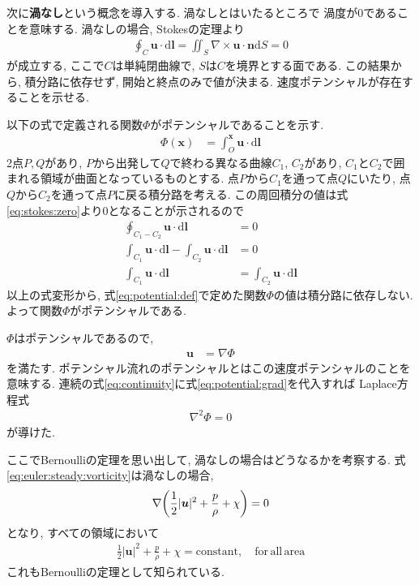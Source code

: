 \documentclass{ltjsarticle}
\begin{document}
次に\textbf{渦なし}という概念を導入する. 渦なしとはいたるところで
渦度が0であることを意味する. 
渦なしの場合, Stokesの定理より
\begin{align}
    \oint_{C} \bm{u}\cdot\mathrm{d}\bm{l} 
    = \iint_S\nabla\times\bm{u}\cdot\bm{n}\mathrm{d}S =0
    \label{eq:stokes:zero}
\end{align}
が成立する, 
ここで$C$は単純閉曲線で, $S$は$C$を境界とする面である. 
この結果から, 積分路に依存せず, 開始と終点のみで値が決まる.
速度ポテンシャルが存在することを示せる.

以下の式で定義される関数$\Phi$がポテンシャルであることを示す.
\begin{align}
    \Phi(\bm{x}) &= \int_O^{\bm{x}} \bm{u}\cdot\mathrm{d}\bm{l} \label{eq:potential:def}
\end{align}
2点$P,Q$があり, $P$から出発して$Q$で終わる異なる曲線$C_1$, $C_2$があり,
$C_1$と$C_2$で囲まれる領域が曲面となっているものとする.
点$P$から$C_1$を通って点$Q$にいたり, 点$Q$から$C_2$を通って点$P$に戻る積分路を考える.
この周回積分の値は式\eqref{eq:stokes:zero}より0となることが示されるので
\begin{align}
    \oint_{C_1-C_2}\bm{u}\cdot\mathrm{d}\bm{l} &= 0 \\
    \int_{C_1}\bm{u}\cdot\mathrm{d}\bm{l}-\int_{C_2}\bm{u}\cdot\mathrm{d}\bm{l} &=0\\
    \int_{C_1}\bm{u}\cdot\mathrm{d}\bm{l}&=\int_{C_2}\bm{u}\cdot\mathrm{d}\bm{l}
\end{align}
以上の式変形から, 式\eqref{eq:potential:def}で定めた関数$\Phi$の値は積分路に依存しない.
よって関数$\Phi$がポテンシャルである.

$\Phi$はポテンシャルであるので,
\begin{align}
    \bm{u} &= \nabla\Phi \label{eq:potential:grad}
\end{align}
を満たす.
ポテンシャル流れのポテンシャルとはこの速度ポテンシャルのことを意味する.
連続の式\eqref{eq:continuity}に式\eqref{eq:potential:grad}を代入すれば
Laplace方程式
\begin{align}
    \nabla^2\Phi = 0 \label{eq:laplace}
\end{align}
が導けた.

ここでBernoulliの定理を思い出して, 渦なしの場合はどうなるかを考察する.
式\eqref{eq:euler:steady:vorticity}は渦なしの場合,
\begin{align}
    \nabla\qty(\frac{1}{2}|\bm{u}|^2 + \frac{p}{\rho}+\chi) = 0
\end{align}
となり, すべての領域において
\begin{align}
    \frac{1}{2}|\bm{u}|^2 + \frac{p}{\rho}+\chi = \mathrm{constant},\quad \mathrm{for\,all\,area}
    \label{eq:bernoulli:no_vorticity}
\end{align}
これもBernoulliの定理として知られている.
\end{document}
